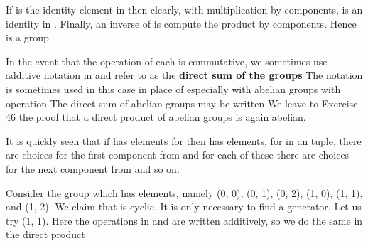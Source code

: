 \documentclass[11pt,oneside]{article}
\begin{document}
\begin{BookBody}
\noindent If  is the identity element in  then clearly, with multiplication by components,  is an identity in . Finally, an inverse of  is  compute the product by components. Hence  is a group. \BookEnd{\blacklozenge}

In the event that the operation of each  is commutative, we sometimes use additive notation in  and refer to  as the\textbf{ direct sum of the groups}  The notation  is sometimes used in this case in place of  especially with abelian groups with operation  The direct sum of abelian groups  may be written  We leave to Exercise 46 the proof that a direct product of abelian groups is again abelian.

It is quickly seen that if  has  elements for  then  has  elements, for in an tuple, there are  choices for the first component from  and for each of these there are  choices for the next component from  and so on.

 Consider the group  which has  elements, namely (0, 0), (0, 1), (0, 2), (1, 0), (1, 1), and (1, 2). We claim that  is cyclic. It is only necessary to find a generator. Let us try (1, 1). Here the operations in  and  are written additively, so we do the same in the direct product 


\end{BookBody}
\end{document}
